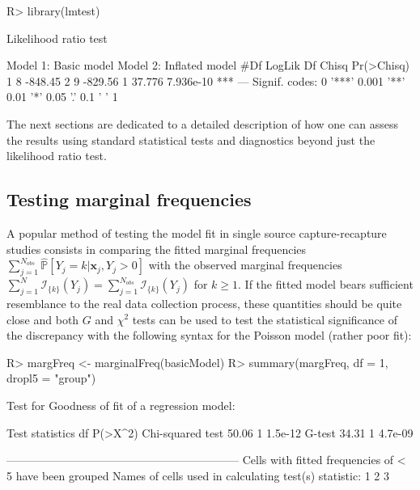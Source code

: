 \documentclass[
]{jss}
\newcommand{\1}{\mathcal{I}} \newcommand{\bZero}{\boldsymbol{0}}
\begin{document}
\begin{CodeChunk}
\begin{CodeInput}
R> library(lmtest)
\end{CodeInput}
\end{CodeChunk}

\begin{CodeChunk}
\begin{CodeOutput}
Likelihood ratio test

Model 1: Basic model
Model 2: Inflated model
  #Df  LogLik Df  Chisq Pr(>Chisq)    
1   8 -848.45                         
2   9 -829.56  1 37.776  7.936e-10 ***
---
Signif. codes:  0 '***' 0.001 '**' 0.01 '*' 0.05 '.' 0.1 ' ' 1
\end{CodeOutput}
\end{CodeChunk}

The next sections are dedicated to a detailed description of how one can
assess the results using standard statistical tests and diagnostics
beyond just the likelihood ratio test.

\subsection{Testing marginal
frequencies}\label{testing-marginal-frequencies}

A popular method of testing the model fit in single source
capture-recapture studies consists in comparing the fitted marginal
frequencies
\(\displaystyle\sum_{j=1}^{N_{obs}}\hat{\mathbb{P}}\left[Y_{j}=k|\boldsymbol{x}_{j}, Y_{j} > 0\right]\)
with the observed marginal frequencies
\(\displaystyle\sum_{j=1}^{N}\mathcal{I}_{\{k\}}(Y_{j})=\sum_{j=1}^{N_{obs}}\mathcal{I}_{\{k\}}(Y_{j})\)
for \(k\geq1\). If the fitted model bears sufficient resemblance to the
real data collection process, these quantities should be quite close and
both \(G\) and \(\chi^{2}\) tests can be used to test the statistical
significance of the discrepancy with the following 
syntax for the Poisson model (rather poor fit):

\begin{CodeChunk}
\begin{CodeInput}
R> margFreq <- marginalFreq(basicModel)
R> summary(margFreq, df = 1, dropl5 = "group")
\end{CodeInput}
\begin{CodeOutput}
Test for Goodness of fit of a regression model:

                 Test statistics df P(>X^2)
Chi-squared test           50.06  1 1.5e-12
G-test                     34.31  1 4.7e-09

-------------------------------------------------------------- 
Cells with fitted frequencies of < 5 have been grouped 
Names of cells used in calculating test(s) statistic: 1 2 3  
\end{CodeOutput}
\end{CodeChunk}
\end{document}
